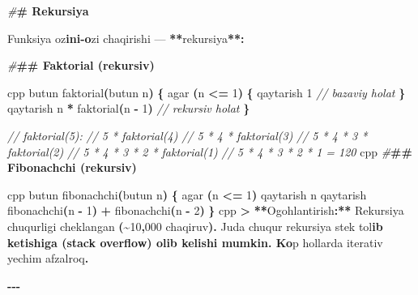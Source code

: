 \documentclass[a4paper,11pt,twoside,openright]{book}
\newenvironment{Shaded}{\begin{snugshade}}{\end{snugshade}}
\newcommand{\BaseNTok}[1]{\textcolor[rgb]{0.00,0.00,0.81}{#1}}
\newcommand{\CharTok}[1]{\textcolor[rgb]{0.31,0.60,0.02}{#1}}
\newcommand{\CommentTok}[1]{\textcolor[rgb]{0.56,0.35,0.01}{\textit{#1}}}
\newcommand{\DecValTok}[1]{\textcolor[rgb]{0.00,0.00,0.81}{#1}}
\newcommand{\ErrorTok}[1]{\textcolor[rgb]{0.64,0.00,0.00}{\textbf{#1}}}
\newcommand{\NormalTok}[1]{#1}
\newcommand{\OperatorTok}[1]{\textcolor[rgb]{0.81,0.36,0.00}{\textbf{#1}}}
\newcommand{\PreprocessorTok}[1]{\textcolor[rgb]{0.56,0.35,0.01}{\textit{#1}}}
\begin{document}
\begin{Shaded}
\begin{Highlighting}[]
\PreprocessorTok{\#}\ErrorTok{\# Rekursiya}

\NormalTok{Funksiya o}\CharTok{\textquotesingle{}z}\ErrorTok{ini{-}o}\CharTok{\textquotesingle{}}\NormalTok{zi chaqirishi — }\OperatorTok{**}\NormalTok{rekursiya}\OperatorTok{**:}

\PreprocessorTok{\#}\ErrorTok{\#\# Faktorial (rekursiv)}

\ErrorTok{\textasciigrave{}\textasciigrave{}\textasciigrave{}}\NormalTok{cpp}
\NormalTok{butun faktorial}\OperatorTok{(}\NormalTok{butun n}\OperatorTok{)} \OperatorTok{\{}
\NormalTok{    agar }\OperatorTok{(}\NormalTok{n }\OperatorTok{\textless{}=} \DecValTok{1}\OperatorTok{)} \OperatorTok{\{}
\NormalTok{        qaytarish }\DecValTok{1}                \CommentTok{// bazaviy holat}
    \OperatorTok{\}}
\NormalTok{    qaytarish n }\OperatorTok{*}\NormalTok{ faktorial}\OperatorTok{(}\NormalTok{n }\OperatorTok{{-}} \DecValTok{1}\OperatorTok{)}  \CommentTok{// rekursiv holat}
\OperatorTok{\}}

\CommentTok{// faktorial(5):}
\CommentTok{//   5 * faktorial(4)}
\CommentTok{//   5 * 4 * faktorial(3)}
\CommentTok{//   5 * 4 * 3 * faktorial(2)}
\CommentTok{//   5 * 4 * 3 * 2 * faktorial(1)}
\CommentTok{//   5 * 4 * 3 * 2 * 1 = 120}
\ErrorTok{\textasciigrave{}\textasciigrave{}\textasciigrave{}}\NormalTok{cpp}
\PreprocessorTok{\#}\ErrorTok{\#\# Fibonachchi (rekursiv)}

\ErrorTok{\textasciigrave{}\textasciigrave{}\textasciigrave{}}\NormalTok{cpp}
\NormalTok{butun fibonachchi}\OperatorTok{(}\NormalTok{butun n}\OperatorTok{)} \OperatorTok{\{}
\NormalTok{    agar }\OperatorTok{(}\NormalTok{n }\OperatorTok{\textless{}=} \DecValTok{1}\OperatorTok{)}\NormalTok{ qaytarish n}
\NormalTok{    qaytarish fibonachchi}\OperatorTok{(}\NormalTok{n }\OperatorTok{{-}} \DecValTok{1}\OperatorTok{)} \OperatorTok{+}\NormalTok{ fibonachchi}\OperatorTok{(}\NormalTok{n }\OperatorTok{{-}} \DecValTok{2}\OperatorTok{)}
\OperatorTok{\}}
\ErrorTok{\textasciigrave{}\textasciigrave{}\textasciigrave{}}\NormalTok{cpp}
\OperatorTok{\textgreater{}} \OperatorTok{**}\NormalTok{Ogohlantirish}\OperatorTok{:**}\NormalTok{ Rekursiya chuqurligi cheklangan }\OperatorTok{(\textasciitilde{}}\DecValTok{10}\OperatorTok{,}\BaseNTok{000}\NormalTok{ chaqiruv}\OperatorTok{).}\NormalTok{ Juda chuqur rekursiya stek to}\CharTok{\textquotesingle{}l}\ErrorTok{ib ketishiga (stack overflow) olib kelishi mumkin. Ko}\CharTok{\textquotesingle{}}\NormalTok{p hollarda iterativ yechim afzalroq}\OperatorTok{.}

\OperatorTok{{-}{-}{-}}


\end{Highlighting}
\end{Shaded}
\end{document}
